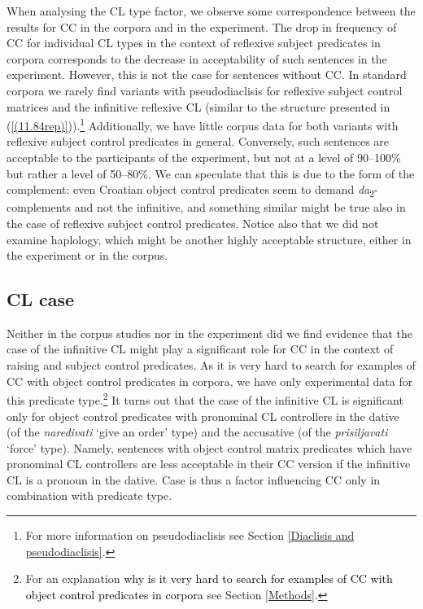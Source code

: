 When analysing the CL type factor, we observe some correspondence between the results for CC in the corpora and in the experiment. The drop in frequency of CC for individual CL types in the context of reflexive subject predicates in corpora corresponds to the decrease in acceptability of such sentences in the experiment. However, this is not the case for sentences without CC. In standard corpora we rarely find variants with pseudodiaclisis for reflexive subject control matrices and the infinitive reflexive CL (similar to the structure presented in (\ref{(11.84rep)})).\footnote{For more information on pseudodiaclisis see Section \ref{Diaclisis and pseudodiaclisis}.} Additionally, we have little corpus data for both variants with reflexive subject control predicates in general. Conversely, such sentences are acceptable to the participants of the experiment, but not at a level of 90--100\% but rather a level of 50--80\%. We can speculate that this is due to the form of the complement: even Croatian object control predicates seem to demand \textit{da}\textsubscript{2}-complements and not the infinitive, and something similar might be true also in the case of reflexive subject control predicates. Notice also that we did not examine haplology, which might be another highly acceptable structure, either in the experiment or in the corpus.

\subsection{CL case}
\label{CL case}
Neither in the corpus studies nor in the experiment did we find evidence that the case of the infinitive CL might play a significant role for CC in the context of raising and subject control predicates. As it is very hard to search for examples of CC with object control predicates in corpora, we have only experimental data for this predicate type.\footnote{For an explanation \textcolor{black}{why is it very hard to search for examples of CC with object control predicates in corpora} see Section \ref{Methods}.} It turns out that the case of the infinitive CL is significant only for object control predicates with pronominal CL controllers in the dative (of the \textit{naređivati} ‘give an order’ type) and the accusative (of the \textit{prisiljavati} ‘force’ type). Namely, sentences with object control matrix predicates which have pronominal CL controllers are less acceptable in their CC version if the infinitive CL is a pronoun in the dative. Case is thus a factor influencing CC only in combination with predicate type. 

